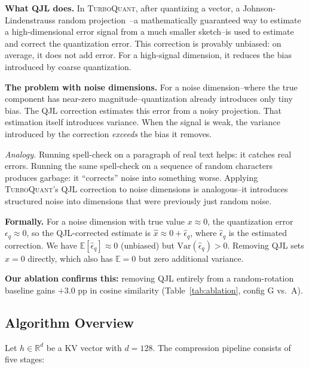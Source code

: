 \documentclass[11pt]{article}
\newcommand{\TQ}{\textsc{TurboQuant}}
\newcommand{\R}{\mathbb{R}}
\newcommand{\E}{\mathbb{E}}
\newcommand{\Var}{\mathrm{Var}}
\begin{document}
\begin{conceptbox}
\label{box:qjlremoval}
\textbf{What QJL does.}  In \TQ{}, after quantizing a vector, a
Johnson-Lindenstrauss random projection~\citep{achlioptas2003database}--a
mathematically guaranteed way to estimate a high-dimensional error signal
from a much smaller sketch--is used
to estimate and correct the quantization error.  This correction is provably
unbiased: on average, it does not add error.  For a high-signal dimension, it
reduces the bias introduced by coarse quantization.

\textbf{The problem with noise dimensions.}  For a noise dimension--where the
true component has near-zero magnitude--quantization already introduces only
tiny bias.  The QJL correction estimates this error from a noisy projection.
That estimation itself introduces variance.  When the signal is weak, the
variance introduced by the correction \emph{exceeds} the bias it removes.

\textit{Analogy.}  Running spell-check on a paragraph of real text helps: it
catches real errors.  Running the same spell-check on a sequence of random
characters produces garbage: it ``corrects'' noise into something worse.
Applying \TQ{}'s QJL correction to noise dimensions is analogous--it
introduces structured noise into dimensions that were previously just random
noise.

\textbf{Formally.}  For a noise dimension with true value $x \approx 0$, the
quantization error $\epsilon_q \approx 0$, so the QJL-corrected estimate is
$\hat{x} \approx 0 + \hat{\epsilon}_q$, where $\hat{\epsilon}_q$ is the
estimated correction.  We have $\E[\hat{\epsilon}_q] \approx 0$ (unbiased) but
$\Var(\hat{\epsilon}_q) > 0$.  Removing QJL sets $\hat{x} = 0$ directly,
which also has $\E = 0$ but zero additional variance.

\textbf{Our ablation confirms this:} removing QJL entirely from a
random-rotation baseline gains $+3.0$ pp in cosine similarity
(Table~\ref{tab:ablation}, config G vs.\ A).
\end{conceptbox}

\subsection{Algorithm Overview}
\label{subsec:overview}

Let $h \in \R^d$ be a KV vector with $d = 128$.  The compression pipeline
consists of five stages:
\end{document}

